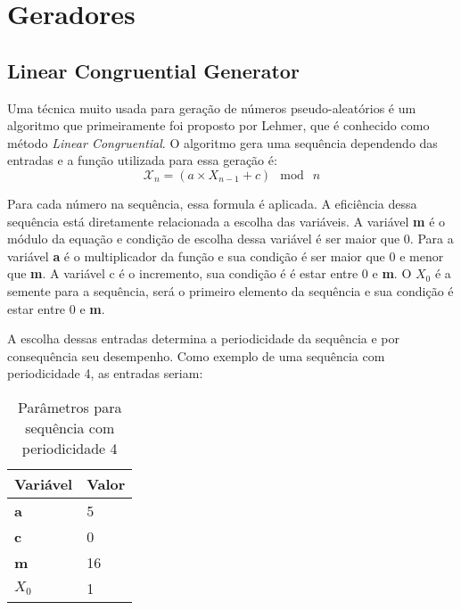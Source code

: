 

\section{Geradores}
\subsection{Linear Congruential Generator}

Uma técnica muito usada para geração de números pseudo-aleatórios é um algoritmo que primeiramente foi proposto por Lehmer, que é conhecido como método \textit{Linear Congruential}. \cite{william-stallings} O algoritmo gera uma sequência dependendo das entradas e a função utilizada para essa geração é:
\begin{equation}
	\label{Função para geração de números aleatórios.}
	\mathcal{X}_n = (a \times X_{n - 1} + c)\: \bmod \: n
\end{equation}

Para cada número na sequência, essa formula é aplicada. A eficiência dessa sequência está diretamente relacionada a escolha das variáveis. A variável \textbf{m} é o módulo da equação e condição de escolha dessa variável é ser maior que 0. Para a variável \textbf{a} é o multiplicador da função e sua condição é ser maior que 0 e menor que \textbf{m}. A variável c é o incremento, sua condição é é estar entre 0 e \textbf{m}. O \textbf{$X_0$} é a semente para a sequência, será o primeiro elemento da sequência e sua condição é estar entre 0 e \textbf{m}.

A escolha dessas entradas determina a periodicidade da sequência e por consequência seu desempenho. Como exemplo de uma sequência com periodicidade 4, as entradas seriam:

\begin{table}[h]
	\centering
	\begin{tabular}{|l|l|}	
	\hline
		Variável & Valor \\ \hline
		\textbf{a} & 5 \\ \hline
		\textbf{c} & 0 \\ \hline
		\textbf{m} & 16 \\ \hline
		\textbf{$X_0$} & 1 \\ \hline
	\end{tabular}
	\caption{Parâmetros para sequência com periodicidade 4}
\end{table}

